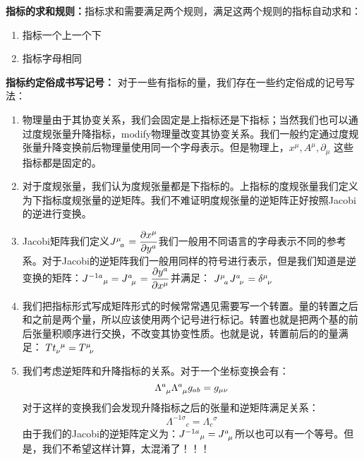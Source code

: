 \textbf{指标的求和规则：}指标求和需要满足两个规则，满足这两个规则的指标自动求和：
\begin{enumerate}
  \item 指标一个上一个下
  \item 指标字母相同
\end{enumerate}

\textbf{指标约定俗成书写记号：}
对于一些有指标的量，我们存在一些约定俗成的记号写法：
\begin{enumerate}
  \item 物理量由于其协变关系，我们会固定是上指标还是下指标；当然我们也可以通过度规张量升降指标，modify物理量改变其协变关系。我们一般约定通过度规张量升降变换前后物理量使用同一个字母表示。但是物理上，$ x^\mu, A^\mu, \partial_\mu$ 这些指标都是固定的。
  \item 对于度规张量，我们认为度规张量都是下指标的。上指标的度规张量我们定义为下指标度规张量的逆矩阵。我们不难证明度规张量的逆矩阵正好按照Jacobi的逆进行变换。
  \item Jacobi矩阵我们定义$ \tensor{J}{^\mu_a} = \displaystyle\frac{\partial x^\mu}{\partial y^a} $我们一般用不同语言的字母表示不同的参考系。对于Jacobi的逆矩阵我们一般用同样的符号进行表示，但是我们知道是逆变换的矩阵：$ J^{-1 a}{}_\mu =  \tensor{J}{^a_\mu} = \displaystyle\frac{\partial y^a}{\partial x^\mu} $并满足： $ \tensor{J}{^\mu_a}\tensor{J}{^a_\nu} = \tensor{\delta}{^\mu_\nu} $ 
  \item 我们把指标形式写成矩阵形式的时候常常遇见需要写一个转置。量的转置之后和之前是两个量，所以应该使用两个记号进行标记。转置也就是把两个基的前后张量积顺序进行交换，不改变其协变性质。也就是说，转置前后的的量满足：
    $ \tensor{Tt}{_\nu^\mu} = \tensor{T}{^\mu_\nu} $  
    
    \item 我们考虑逆矩阵和升降指标的关系。对于一个坐标变换会有：
    \begin{equation}
      \tensor{\Lambda}{^a_\mu}\tensor{\Lambda}{^a_\mu} g_{ab} = g_{\mu\nu} 
      \label{eq:generalcoordinatetrans}
    \end{equation}
    对于这样的变换我们会发现升降指标之后的张量和逆矩阵满足关系：
    \begin{equation}
      \Lambda^{-1 \sigma}{}_c = \Lambda_c{}^\sigma 
      \label{eq:liftandinverse}
    \end{equation}
    由于我们的Jacobi的逆矩阵定义为：$ J^{-1 a}{}_\mu =  \tensor{J}{^a_\mu} $所以也可以有一个等号。但是，我们不希望这样计算，太混淆了！！！
\end{enumerate}


